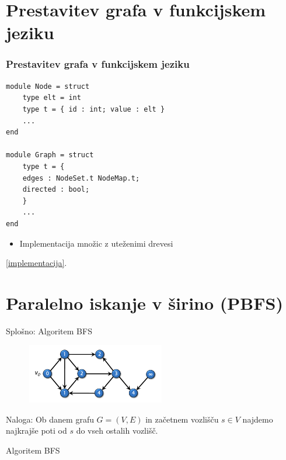 \documentclass{beamer}
\begin{document}
\section{Prestavitev grafa v funkcijskem jeziku}

\begin{frame}[fragile]
    \frametitle{Prestavitev grafa v funkcijskem jeziku}
\begin{verbatim}
module Node = struct
    type elt = int
    type t = { id : int; value : elt }
    ...
end

module Graph = struct
    type t = {
    edges : NodeSet.t NodeMap.t;
    directed : bool;
    }
    ...
end
    \end{verbatim}
    \begin{itemize}
      \item Implementacija množic z uteženimi drevesi
    \end{itemize}
        
    \href{https://github.com/tjazerzen/parallelisation-of-graph-algorithms-in-functional-programming-languages/blob/master/playground/graph/graph.ml}{[implementacija]}.
\end{frame}

\section{Paralelno iskanje v širino (PBFS)}

\begin{frame}{Splošno: Algoritem BFS}
    \begin{figure}
        \centering
        \includegraphics[width=6cm]{slike/parallel_bfs/pbfs_graph_example.png}
        \label{fig:pbfs_graph_example}
    \end{figure}
    Naloga: Ob danem grafu $G=(V, E)$ in začetnem vozlišču $s \in V$ najdemo najkrajše poti od $s$ do vseh ostalih vozlišč.
\end{frame}

\begin{frame}{Algoritem BFS}
    \begin{algorithm}[H]
      \SetAlgoLined
      \DontPrintSemicolon
      \label{alg:non_parallel_bfs}
    \end{algorithm}
  \end{frame}
  
\end{document}
